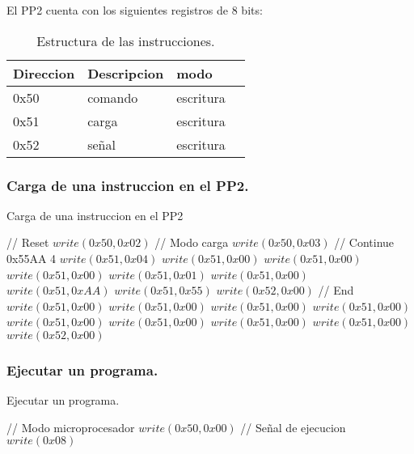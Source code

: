 El PP2 cuenta con los siguientes registros de 8 bits:

\begin{table}[ht]
    \centering
    \begin{tabular}{|l|l|l|l|}
    \hline
    Direccion  & Descripcion & modo  \\
    \hline
    0x50 & comando & escritura\\
    \hline
    0x51 & carga   & escritura\\
    \hline
    0x52 & señal   & escritura \\
    \hline
\end{tabular}
\caption{\label{tab:pp2_reg}Estructura de las instrucciones.}
\end{table}
\newpage
\subsubsection{Carga de una instruccion en el PP2.}
\begin{algorithm}
    \caption{Carga de una instruccion en el PP2}\label{algo_pp2_load}
    \begin{algorithmic}[1]
    \State // {Reset}
    \State $write(0x50, 0x02)$
    \State // {Modo carga}
    \State $write(0x50, 0x03)$
    \State // {Continue 0x55AA 4}
    \State $write(0x51, 0x04)$
    \State $write(0x51,0x00)$
    \State $write(0x51,0x00)$
    \State $write(0x51,0x00)$
    \State $write(0x51,0x01)$
    \State $write(0x51,0x00)$
    \State $write(0x51,0xAA)$
    \State $write(0x51,0x55)$
    \State $write(0x52, 0x00)$
    \State // {End}
    \State $write(0x51,0x00)$
    \State $write(0x51,0x00)$
    \State $write(0x51,0x00)$
    \State $write(0x51,0x00)$
    \State $write(0x51,0x00)$
    \State $write(0x51,0x00)$
    \State $write(0x51,0x00)$
    \State $write(0x51,0x00)$
    \State $write(0x52,0x00)$
    \EndProcedure
    \end{algorithmic}
    \end{algorithm}

\subsubsection{Ejecutar un programa.}
\begin{algorithm}
    \caption{Ejecutar un programa.}\label{algo_pp2_exe}
    \begin{algorithmic}[1]
    \State // {Modo microprocesador}
    \State $write(0x50, 0x00)$
    \State // {Señal de ejecucion}
    \State $write(0x08)$
    \EndProcedure
    \end{algorithmic}
    \end{algorithm}
\newpage
